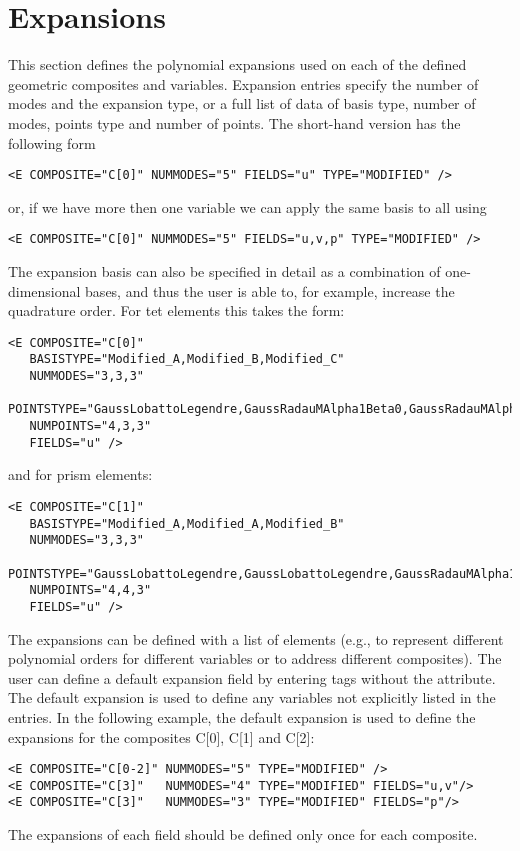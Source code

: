 \section{Expansions}
\label{sec:xml:expansions}
This section defines the polynomial expansions used on each of the defined
geometric composites and variables. Expansion entries specify the number of
modes and the expansion type, or a full list of data of basis type, number of
modes, points type and number of points. The short-hand version has the
following form

\begin{lstlisting}[style=XMLStyle]
<E COMPOSITE="C[0]" NUMMODES="5" FIELDS="u" TYPE="MODIFIED" />
\end{lstlisting}

or, if we have more then one variable we can apply the same basis to all using

\begin{lstlisting}[style=XMLStyle]
<E COMPOSITE="C[0]" NUMMODES="5" FIELDS="u,v,p" TYPE="MODIFIED" />
\end{lstlisting}

The expansion basis can also be specified in detail as a combination of
one-dimensional bases, and thus the user is able to, for example, increase the
quadrature order. For tet elements this takes the form:

\begin{lstlisting}[style=XMLStyle]
<E COMPOSITE="C[0]" 
   BASISTYPE="Modified_A,Modified_B,Modified_C" 
   NUMMODES="3,3,3"
   POINTSTYPE="GaussLobattoLegendre,GaussRadauMAlpha1Beta0,GaussRadauMAlpha2Beta0"
   NUMPOINTS="4,3,3"
   FIELDS="u" />
\end{lstlisting}

and for prism elements:

\begin{lstlisting}[style=XMLStyle]
<E COMPOSITE="C[1]" 
   BASISTYPE="Modified_A,Modified_A,Modified_B" 
   NUMMODES="3,3,3"
   POINTSTYPE="GaussLobattoLegendre,GaussLobattoLegendre,GaussRadauMAlpha1Beta0"
   NUMPOINTS="4,4,3"
   FIELDS="u" />
\end{lstlisting}

The expansions can be defined with a list of  elements (e.g., to
represent different polynomial orders for different variables or to address
different composites). The user can define a default expansion field by entering
 tags without the  attribute. The default expansion is
used to define any variables not explicitly listed in the  entries.
In the following example, the default expansion is used to define the expansions
for the composites C[0], C[1] and C[2]:

\begin{lstlisting}[style=XMLStyle]
<E COMPOSITE="C[0-2]" NUMMODES="5" TYPE="MODIFIED" />
<E COMPOSITE="C[3]"   NUMMODES="4" TYPE="MODIFIED" FIELDS="u,v"/>
<E COMPOSITE="C[3]"   NUMMODES="3" TYPE="MODIFIED" FIELDS="p"/>
\end{lstlisting}

The expansions of each field should be defined only once for each composite.
